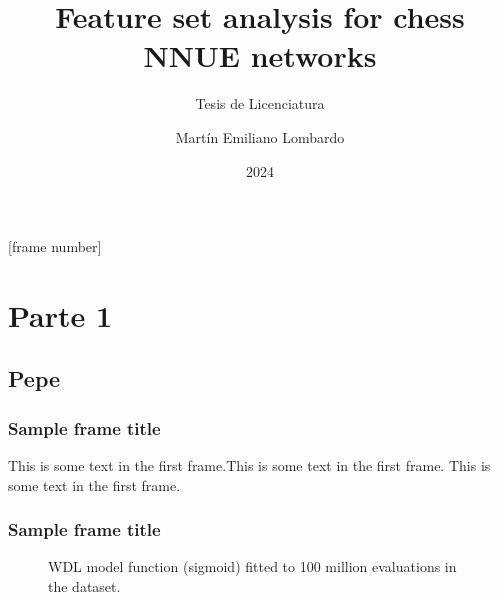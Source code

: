 \title{Feature set analysis for chess NNUE networks}
\subtitle{Tesis de Licenciatura}
\author{Martín Emiliano Lombardo}
\date{2024}

[frame number]{}



\frame{\titlepage}

\section{Parte 1}

\subsection{Pepe}

\begin{frame}
\frametitle{Sample frame title}
This is some text in the first frame.\pause This is some text in the first frame. This is some text in the first frame.
\end{frame}

\begin{frame}
\frametitle{Sample frame title}

\begin{figure}[H]
\centering
{}
\caption{WDL model function (sigmoid) fitted to 100 million evaluations in the dataset.}
\label{wdl-fit}
\end{figure}

\end{frame}

